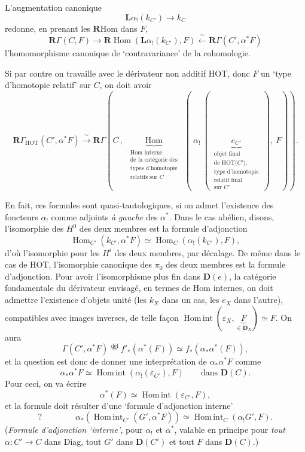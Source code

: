 \documentclass[11pt]{article}
\newcommand{\printedpage}[1]{\marginpar{\footnotesize p.~#1}}
\newcommand{\msp}[1]{\marginpar{\footnotesize [#1]}}
\newcommand{\Homint}{\operatorname{Hom\,int}}
\begin{document}
\msp{page 8}
L'augmentation canonique
\[ \mathbf{L}\alpha_!(k_{C'}) \longrightarrow k_C \]
redonne, en prenant les $\mathbf{R}\mathrm{Hom}$ dans $F$,
\[ \mathbf{R}\Gamma(C,F) \longrightarrow \mathbf{R}\operatorname{Hom}(\mathbf{L}\alpha_!(k_{C'}), F) \xleftarrow{\ \sim\ } \mathbf{R}\Gamma(C', \alpha^*F) \]
l'homomorphisme canonique de `contravariance' de la cohomologie.

Si par contre on travaille avec le dérivateur non additif HOT, donc $F$ un `type d'homotopie relatif' sur $C$, on doit avoir
\[ \boxed{\mathbf{R}\Gamma_{\mathrm{HOT}}(C', \alpha^*F) \xrightarrow{\ \sim\ } \mathbf{R}\Gamma(C\,,\ \underbrace{\operatorname{Hom}}_{\substack{\text{Hom interne}\\ \text{de la catégorie des}\\ \text{types d'homotopie}\\ \text{relatifs sur $C$}}}\ (\ \alpha_!\ (\ \underbrace{e_{C'}}_{\substack{\text{objet final}\\ \text{de HOT($C'$),}\\ \text{type d'homotopie}\\ \text{relatif final}\\ \text{sur $C'$}}}\ ),\ F)).} \]

\printedpage{6}
En fait, ces formules sont quasi-tautologiques, si on admet l'existence des foncteurs $\alpha_!$ comme adjoints \textit{à gauche} des $\alpha^*$. Dans le cas abélien, disons,
\msp{page 9}
l'isomorphie des $H^0$ des deux membres est la formule d'adjonction
\[ \operatorname{Hom}_{C'}(k_{C'}, \alpha^*F) \simeq \operatorname{Hom}_C(\alpha_!(k_{C'}), F), \]
d'où l'isomorphie pour les $H^i$ des deux membres, par décalage. De même dans le cas de HOT, l'isomorphie canonique des $\pi_0$ des deux membres est la formule d'adjonction. Pour avoir l'isomorphisme plus fin dans $\mathbf{D}(e)$, la catégorie fondamentale du dérivateur envisagé, en termes de Hom internes, on doit admettre l'existence d'objets unité (les $k_X$ dans un cas, les $e_X$ dans l'autre), compatibles avec images inverses, de telle façon $\Homint(\varepsilon_X, \underbrace{F}_{\in\mathbf{D}_X}) \simeq F$. On aura
\[ \Gamma(C', \alpha^*F) \overset{\text{déf}}{=} f'_*(\alpha^*(F)) \simeq f_*(\alpha_*\alpha^*(F)), \]
et la question est donc de donner une interprétation de $\alpha_*\alpha^*F$ comme
\[ \alpha_*\alpha^*F \simeq \Homint(\alpha_!(\varepsilon_{C'}), F) \qquad \text{dans } \mathbf{D}(C). \]
Pour ceci, on va écrire
\[ \alpha^*(F) \simeq \Homint(\varepsilon_{C'}, F), \]
et la formule doit résulter d'une `formule d'adjonction interne'
\msp{page 10}
\[ ? \qquad\qquad \boxed{\alpha_*(\Homint_{C'}(G', \alpha^*F)) \simeq \Homint_C(\alpha_!G', F).} \]
(\textit{Formule d'adjonction `interne',} pour $\alpha_!$ et $\alpha^*$, valable en principe pour \textit{tout} $\alpha : C' \longrightarrow C$ dans Diag, tout $G'$ dans $\mathbf{D}(C')$ et tout $F$ dans $\mathbf{D}(C)$.)
\end{document}
